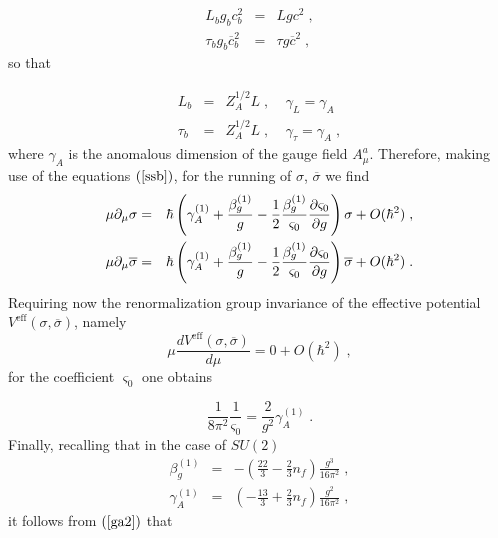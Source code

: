 \documentclass[a4paper,12pt]{article}
\begin{document}
\begin{eqnarray}
L_{b}g_{b}c_{b}^{2} &=&Lgc^{2}\;,  \label{ab} \\
\tau _{b}g_{b}\overline{c}_{b}^{2} &=&\tau g\overline{c}^{2}\;,  \nonumber
\end{eqnarray}
so that

\begin{eqnarray}
L_{b} &=&Z_{A}^{1/2}L\;,\;\;\;\;\gamma _{L}=\gamma _{A}  \label{rl} \\
\tau _{b} &=&Z_{A}^{1/2}L\;,\;\;\;\;\gamma _{\tau }=\gamma _{A}\;,  \nonumber
\end{eqnarray}
where $\gamma _{A}$ is the anomalous dimension of the gauge field $A_{\mu
}^{a}$. Therefore, making use of the equations $\left( \ref{ssb}\right) $,
for the running of $\sigma $, $\overline{\sigma }$ we find 
\begin{eqnarray}
\mu \partial _{\mu }\sigma &=&\hbar \left( \gamma _{A}^{(1)}+\frac{\beta
_{g}^{(1)}}{g}-\frac{1}{2}\frac{\beta _{g}^{(1)}}{\varsigma _{0}}\frac{%
\partial \varsigma _{0}}{\partial g}\right) \sigma +O(\hbar ^{2})\;,
\label{rssb} \\
\mu \partial _{\mu }\overline{\sigma } &=&\hbar \left( \gamma _{A}^{(1)}+%
\frac{\beta _{g}^{(1)}}{g}-\frac{1}{2}\frac{\beta _{g}^{(1)}}{\varsigma _{0}}%
\frac{\partial \varsigma _{0}}{\partial g}\right) \overline{\sigma }+O(\hbar
^{2})\;.  \nonumber
\end{eqnarray}
Requiring now the renormalization group invariance of the effective
potential $V^{\mathrm{eff}}(\sigma ,\overline{\sigma })$, namely 
\begin{equation}
\mu \frac{dV^{\mathrm{eff}}(\sigma ,\overline{\sigma })}{d\mu }=0+O(\hbar
^{2})\;,  \label{rgegh}
\end{equation}
for the coefficient $\varsigma _{0}$ one obtains

\begin{equation}
\frac{1}{8\pi ^{2}}\frac{1}{\varsigma _{0}}=\frac{2}{g^{2}}\gamma
_{A}^{(1)}\;.  \label{xiv}
\end{equation}
Finally, recalling that in the case of $SU(2)$ \cite{gr} 
\begin{eqnarray}
\beta _{g}^{(1)} &=&-\left( \frac{22}{3}-\frac{2}{3}n_{f}\right) \frac{g^{3}%
}{16\pi ^{2}}\;,  \label{ga1} \\
\gamma _{A}^{(1)} &=&\left( -\frac{13}{3}+\frac{2}{3}n_{f}\right) \frac{g^{2}%
}{16\pi ^{2}}\;,  \label{ga2}
\end{eqnarray}
it follows from $\left( \ref{ga2}\right) $ that
\end{document}
